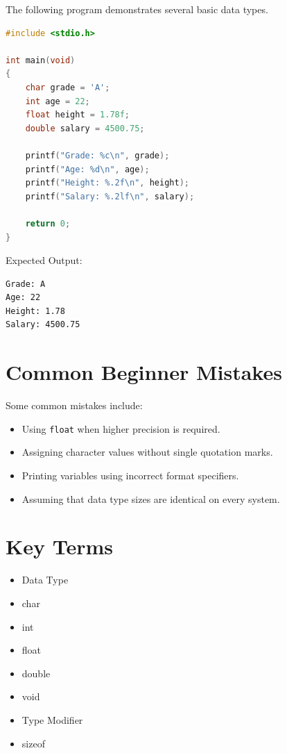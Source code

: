 \documentclass[12pt,openany]{book}
\begin{document}
The following program demonstrates several basic data types.

\begin{lstlisting}[language=C]
#include <stdio.h>

int main(void)
{
    char grade = 'A';
    int age = 22;
    float height = 1.78f;
    double salary = 4500.75;

    printf("Grade: %c\n", grade);
    printf("Age: %d\n", age);
    printf("Height: %.2f\n", height);
    printf("Salary: %.2lf\n", salary);

    return 0;
}
\end{lstlisting}

Expected Output:

\begin{lstlisting}
Grade: A
Age: 22
Height: 1.78
Salary: 4500.75
\end{lstlisting}

\section{Common Beginner Mistakes}

Some common mistakes include:

\begin{itemize}
    \item Using \texttt{float} when higher precision is required.
    \item Assigning character values without single quotation marks.
    \item Printing variables using incorrect format specifiers.
    \item Assuming that data type sizes are identical on every system.
\end{itemize}
\section{Key Terms}

\begin{itemize}
    \item Data Type
    \item char
    \item int
    \item float
    \item double
    \item void
    \item Type Modifier
    \item sizeof
\end{itemize}
\end{document}
